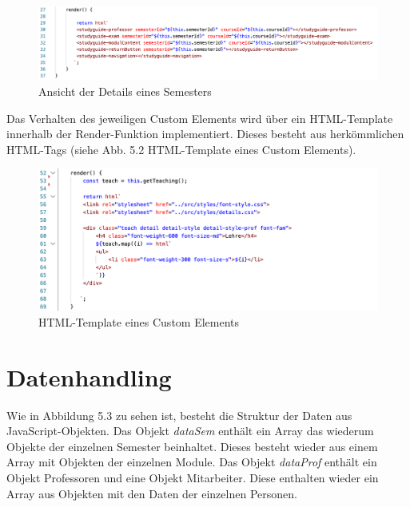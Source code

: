 \documentclass[12pt,					%
							 oneside,			%
							 a4paper,			%
							 halfparskip,		%
							 liststotoc,			%
							 bibtotoc,			%
							 fleqn,				%
							 pointlessnumbers]	%
							 {scrreprt}
\begin{document}
	\begin{figure}[h]
		\centering
		\includegraphics[width=1\textwidth]{pictures/custom-element.png}
		\caption{Ansicht der Details eines Semesters}						
		\label{custom-element}
	\end{figure}
	
	Das Verhalten des jeweiligen Custom Elements wird über ein HTML-Template innerhalb der Render-Funktion implementiert. Dieses besteht aus herkömmlichen HTML-Tags (siehe Abb. 5.2 HTML-Template eines Custom Elements).

	\begin{figure}[h]
		\centering
		\includegraphics[width=1\textwidth]{pictures/html-template.png}
		\caption{HTML-Template eines Custom Elements}						
		\label{html-template}
	\end{figure}
\newpage	
	\section{Datenhandling}
	Wie in Abbildung 5.3 zu sehen ist, besteht die Struktur der Daten aus JavaScript-Objekten. Das Objekt \textit{dataSem} enthält ein Array das wiederum Objekte der einzelnen Semester beinhaltet. Dieses besteht wieder aus einem Array mit Objekten der einzelnen Module.  Das Objekt \textit{dataProf} enthält ein Objekt Professoren und eine Objekt Mitarbeiter. Diese enthalten wieder ein Array aus Objekten mit den Daten der einzelnen Personen.
	
\end{document}
